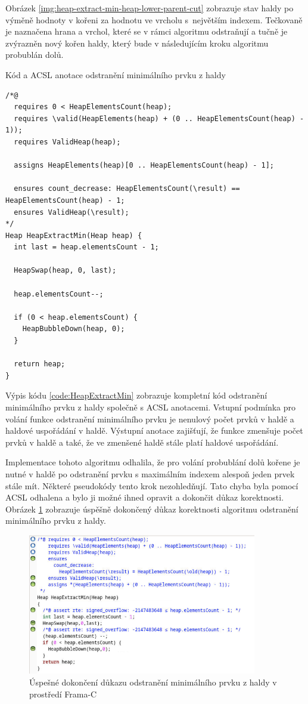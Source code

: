 Obrázek \ref{img:heap-extract-min-heap-lower-parent-cut} zobrazuje stav haldy po výměně hodnoty v kořeni za hodnotu ve vrcholu s~největším indexem. Tečkovaně je naznačena hrana a vrchol, které se v rámci algoritmu odstraňují a tučně je zvýrazněn nový kořen haldy, který bude v následujícím kroku algoritmu probublán dolů.

\begin{listing}[H]
	\caption{Kód a ACSL anotace odstranění minimálního prvku z haldy}
	\label{code:HeapExtractMin}
	\begin{verbatim}
/*@
  requires 0 < HeapElementsCount(heap);
  requires \valid(HeapElements(heap) + (0 .. HeapElementsCount(heap) - 1));
  requires ValidHeap(heap);

  assigns HeapElements(heap)[0 .. HeapElementsCount(heap) - 1];

  ensures count_decrease: HeapElementsCount(\result) == HeapElementsCount(heap) - 1;
  ensures ValidHeap(\result);
*/
Heap HeapExtractMin(Heap heap) {
  int last = heap.elementsCount - 1;

  HeapSwap(heap, 0, last);

  heap.elementsCount--;

  if (0 < heap.elementsCount) {
    HeapBubbleDown(heap, 0);
  }

  return heap;
}
	\end{verbatim}
\end{listing}

Výpis kódu \ref{code:HeapExtractMin} zobrazuje kompletní kód odstranění minimálního prvku z haldy společně s ACSL anotacemi. Vstupní podmínka pro volání funkce odstranění minimálního prvku je nenulový počet prvků v haldě a haldové uspořádání v haldě. Výstupní anotace zajišťují, že funkce zmenšuje počet prvků v haldě a také, že ve zmenšené haldě stále platí haldové uspořádání.

Implementace tohoto algoritmu odhalila, že pro volání probublání dolů kořene je nutné v haldě po odstranění prvku s maximálním indexem alespoň jeden prvek stále mít. Některé pseudokódy tento krok nezohledňují. Tato chyba byla pomocí ACSL odhalena a bylo ji možné ihned opravit a dokončit důkaz korektnosti. Obrázek \ref{img:F-C-HeapExtractMin} zobrazuje úspěšně dokončený důkaz korektnosti algoritmu odstranění minimálního prvku z haldy.

\begin{figure}[H]
	\centering
	\includegraphics[width=10cm]{images/frama-c-HeapExtractMin}
	\caption{Úspešné dokončení důkazu odstranění minimálního prvku z haldy v prostředí Frama-C}
	\label{img:F-C-HeapExtractMin}
\end{figure}



